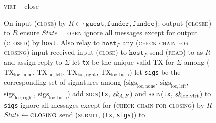 \begin{figure}[H]
  \begin{processbox}{\textsc{virt} -- close}
    \begin{algorithmic}[1]
      \State On input (\textsc{close}) by $R \in \{\texttt{guest},
      \texttt{funder}, \texttt{fundee}\}$: 
      \Indent
          \State output (\textsc{closed}) to $R$
        \EndIf
        \State ensure \textit{State} = \textsc{open}
         
          \State ignore all messages except for output (\textsc{closed}) by
          \texttt{host}. Also relay to $\texttt{host}_P$ any (\textsc{check
          chain for closing}) input received
          \State input (\textsc{close}) to $\texttt{host}_P$
        \EndIf
        \State {}
        \State send (\textsc{read}) to \ledger as $R$ and assign reply to
        $\Sigma$
        \State let \texttt{tx} be the unique valid TX for $\Sigma$ among
        ($\mathrm{TX}_{\mathrm{loc}, \mathrm{none}}$,
        $\mathrm{TX}_{\mathrm{loc}, \mathrm{left}}$, $\mathrm{TX}_{\mathrm{loc},
        \mathrm{right}}$, $\mathrm{TX}_{\mathrm{loc}, \mathrm{both}}$)
        \State let \texttt{sigs} be the corresponding set of signatures among
        ($\mathrm{sigs}_{\mathrm{loc}, \mathrm{none}}$,
        $\mathrm{sigs}_{\mathrm{loc}, \mathrm{left}}$,
        $\mathrm{sigs}_{\mathrm{loc}, \mathrm{right}}$,
        $\mathrm{sigs}_{\mathrm{loc}, \mathrm{both}}$)
        \State add \textsc{sign}(\texttt{tx}, $\textit{sk}_{A, F}$) and
        \textsc{sign}(\texttt{tx}, $\textit{sk}_{\mathrm{loc}, \mathrm{virt}}$) to
        \texttt{sigs} 
        \State ignore all messages except for (\textsc{check chain for closing})
        by $R$
        \State $\textit{State} \gets \textsc{closing}$
        \State send (\textsc{submit}, (\texttt{tx}, \texttt{sigs})) to \ledger
      \EndIndent
      \Statex


\end{algorithmic}
\end{processbox}
\end{figure}

